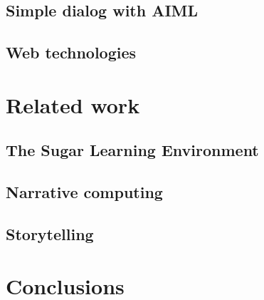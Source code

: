 \documentclass{acm_proc_article-sp}
\begin{document}
\subsection{Simple dialog with AIML}
\subsection{Web technologies}

\section{Related work}\label{sec:related}
\cite{chang:tinkrbook, flores:uruguay, idb:peru}
\subsection{The Sugar Learning Environment}
\subsection{Narrative computing}
\subsection{Storytelling}

\section{Conclusions}

%

%
%
\balancecolumns
\end{document}
